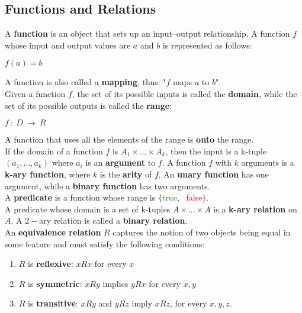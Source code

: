 \documentclass{article}
\begin{document}
\subsection{Functions and Relations}
A \textbf{function} is an object that sets up an input–output relationship. A function $f$ whose input and output values are $a$ and $b$ is represented as follows:
\begin{center}
    $f(a) = b$
\end{center}
A function is also called a \textbf{mapping}, thus: "$f$ maps $a$ to $b$". \\
Given a function $f$, the set of its possible inputs is called the \textbf{domain}, while the set of its possible outputs is called the \textbf{range}:
\begin{center}
    $f \ : \ D \ \rightarrow \ R$
\end{center}
A function that uses all the elements of the range is \textbf{onto} the range. \\
If the domain of a function $f$ is $A_1 \times ... \times A_k$, then the input is a k-tuple $(a_1, ..., a_k)$ where $a_i$ is an \textbf{argument} to $f$. A function $f$ with $k$ arguments is a \textbf{k-ary function}, where $k$ is the \textbf{arity} of $f$. An \textbf{unary function} has one argument, while a \textbf{binary function} has two arguments. \\
A \textbf{predicate} is a function whose range is $\{$\textcolor{ForestGreen}{true}, \ \textcolor{red}{false}$\}$. \\
A predicate whose domain is a set of k-tuples $A \times ... \times A$ is a \textbf{k-ary relation} on $A$. A $2-$ary relation is called a \textbf{binary relation}. \\
An \textbf{equivalence relation} $R$ captures the notion of two objects being equal in some feature and must satisfy the following conditions:
\begin{enumerate}
    \item $R$ is \textbf{reflexive}: $xRx$ for every $x$
    \item $R$ is \textbf{symmetric}: $xRy$ implies $yRx$ for every $x,y$
    \item $R$ is \textbf{transitive}: $xRy$ and $yRz$ imply $xRz$, for every $x,y,z$.
\end{enumerate}
\end{document}
